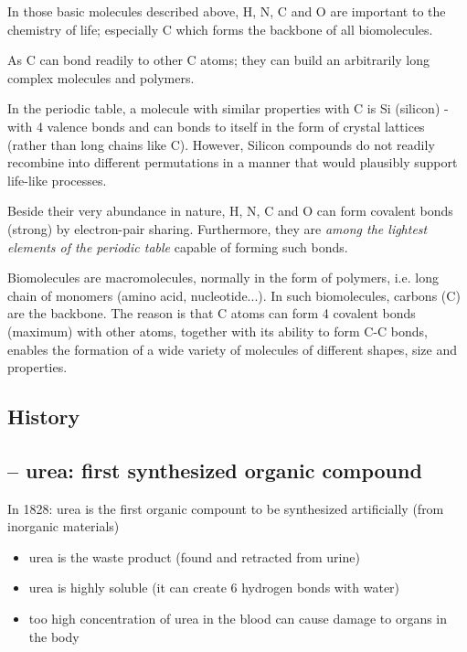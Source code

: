 \begin{framed}
  In those basic molecules described above, H, N, C and O are
  important to the chemistry of life; especially C which forms the
  backbone of all biomolecules. 
  
  As C can bond readily to other C atoms; they can build an arbitrarily long
  complex molecules and polymers. 
  
  In the periodic table, a molecule with similar properties with C is Si
  (silicon) - with 4 valence bonds and can bonds to itself in the form of
  crystal lattices (rather than long chains like C). However, 
  Silicon compounds do not readily recombine into different permutations in a
  manner that would plausibly support life-like processes.
\end{framed}

Beside their very abundance in nature, H, N, C and O can form covalent
bonds (strong) by electron-pair sharing. Furthermore, they are
{\it among the lightest elements of the periodic table} capable of
forming such bonds. 

Biomolecules are macromolecules, normally in the form of polymers,
i.e. long chain of monomers (amino acid, nucleotide...). In such
biomolecules, carbons (C) are the backbone. The reason is that C atoms can
form 4 covalent bonds (maximum) with other atoms, together with its
ability to form C-C bonds, enables the formation of a wide variety of
molecules of different shapes, size and properties.


\subsection{History }
\label{sec:history-}

\subsection{-- urea: first synthesized organic compound}

In 1828: urea  is the first organic compount  to be synthesized artificially (from inorganic materials)
\begin{itemize}
\item	urea is the waste product (found and retracted from urine)
 \item	urea is highly soluble (it can create 6 hydrogen bonds with water)
 \item	too high concentration of urea in the blood can cause damage to organs in the body

\end{itemize}

